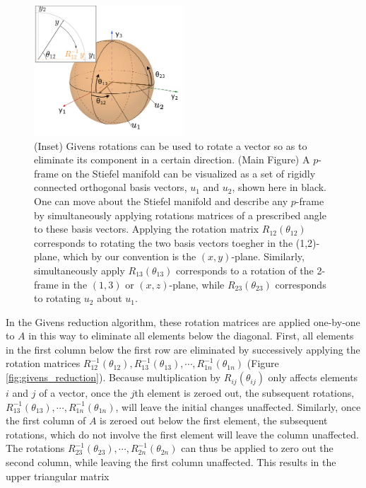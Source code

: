 \documentclass[ba]{imsart}
\numberwithin{equation}{section}
\theoremstyle{plain}
\begin{document}
\begin{figure}[h]
\centering
\vspace{.1in}
\includegraphics[width=0.5\textwidth]{figures/stiefel_geom_new.png}
\vspace{.05in}
\caption{(Inset) Givens rotations can be used to rotate a vector so as to eliminate its component in a certain direction. (Main Figure) A $p$-frame on the Stiefel manifold can be visualized as a set of rigidly connected orthogonal basis vectors, $u_1$ and $u_2$, shown here in black. One can move about the Stiefel manifold and describe any $p$-frame by simultaneously applying rotations matrices of a prescribed angle to these basis vectors. Applying the rotation matrix $R_{12}(\theta_{12})$ corresponds to rotating the two basis vectors toegher in the (1,2)-plane, which by our convention is the $(x,y)$-plane. Similarly, simultaneously apply $R_{13}(\theta_{13})$ corresponds to a rotation of the 2-frame in the $(1,3)$ or $(x,z)$-plane, while $R_{23}(\theta_{23})$ corresponds to rotating $u_2$ about $u_1$.}
\label{fig:StiefelGeom}
\end{figure}

\noindent In the Givens reduction algorithm, these rotation matrices are applied one-by-one to $A$ in this way to eliminate all elements below the diagonal. First, all elements in the first column below the first row are eliminated by successively applying the rotation matrices $R_{12}^{-1}(\theta_{12}), R_{13}^{-1}(\theta_{13}), \cdots, R_{1n}^{-1}(\theta_{1n})$  (Figure \ref{fig:givens_reduction}). Because multiplication by $R_{ij}(\theta_{ij})$ only affects elements $i$ and $j$ of a vector, once the $j$th element is zeroed out, the subsequent rotations, $R_{13}^{-1}(\theta_{13}), \cdots, R_{1n}^{-1}(\theta_{1n})$, will leave the initial changes unaffected. Similarly, once the first column of $A$ is zeroed out below the first element, the subsequent rotations, which do not involve the first element will leave the column unaffected. The rotations  $R_{23}^{-1}(\theta_{23}), \cdots, R_{2n}^{-1}(\theta_{2n})$ can thus be applied to zero out the second column, while leaving the first column unaffected. This results in the upper triangular matrix
\end{document}
